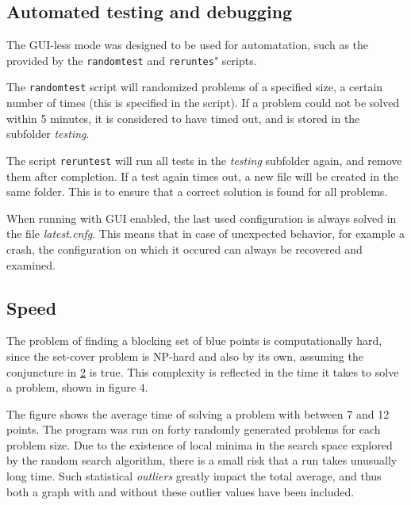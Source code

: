 \documentclass[a4paper,12pt]{article}
\begin{document}
\subsection{Automated testing and debugging}
The GUI-less mode was designed to be used for automatation, such as the provided by the \texttt{randomtest} and \texttt{reruntes}" scripts.

The \texttt{randomtest} script will randomized problems of a specified size, a certain number of times (this is specified in the script). If a problem could not be solved within 5 minutes, it is considered to have timed out, and is stored in the subfolder \emph{testing}.

The script \texttt{reruntest} will run all tests in the \emph{testing} subfolder again, and remove them after completion. If a test again times out, a new file will be created in the same folder. This is to ensure that a correct solution is found for all problems.

When running with GUI enabled, the last used configuration is always solved in the file \emph{latest.cnfg}. This means that in case of unexpected behavior, for example a crash, the configuration on which it occured can always be recovered and examined.

\subsection{Speed}
The problem of finding a blocking set of blue points is computationally hard, since the set-cover problem is NP-hard and also by its own, assuming the conjuncture in \hyperref[ref:blocking]{2} is true. This complexity is reflected in the time it takes to solve a problem, shown in figure 4.

The figure shows the average time of solving a problem with between 7 and 12 points. The program was run on forty randomly generated problems for each problem size. Due to the existence of local minima in the search space explored by the random search algorithm, there is a small risk that a run takes unusually long time. Such statistical \emph{outliers} greatly impact the total average, and thus both a graph with and without these outlier values have been included.
\end{document}
